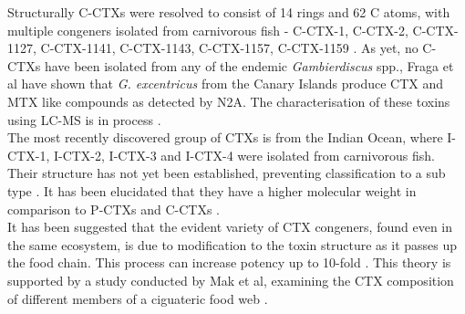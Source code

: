 \documentclass[12pt]{article}
\begin{document}
Structurally C-CTXs were resolved to consist of 14 rings and 62 C atoms, with multiple congeners isolated from carnivorous fish - C-CTX-1, C-CTX-2, C-CTX-1127, C-CTX-1141, C-CTX-1143, C-CTX-1157, C-CTX-1159 \cite{vernoux1997isolation,lewis1998structure,pottier2003identification,pottier2002characterisation}. As yet, no C-CTXs have been isolated from any of the endemic \emph{Gambierdiscus} spp., Fraga et al have shown that \emph{G. excentricus} from the Canary Islands produce CTX and MTX like compounds as detected by N2A. The characterisation of these toxins using LC-MS is in process \cite{fraga2011gambierdiscus}. \\

The most recently discovered group of CTXs is from the Indian Ocean, where I-CTX-1, I-CTX-2, I-CTX-3 and I-CTX-4 were isolated from carnivorous fish. Their structure has not yet been established, preventing classification to a sub type \cite{hamilton2002multiple,hamilton2002isolation}. It has been elucidated that they have a higher molecular weight in comparison to P-CTXs and C-CTXs \cite{caillaud2010update,hamilton2002multiple,hamilton2002isolation}. \\ %

It has been suggested that the evident variety of CTX congeners, found even in the same ecosystem, is due to modification to the toxin structure as it passes up the food chain. This process can increase potency up to 10-fold \cite{hokama1996human,lewis2006ciguatera}. This theory is supported by a study conducted by Mak et al, examining the CTX composition of different members of a ciguateric food web \cite{mak2013pacific}.

\end{document}
